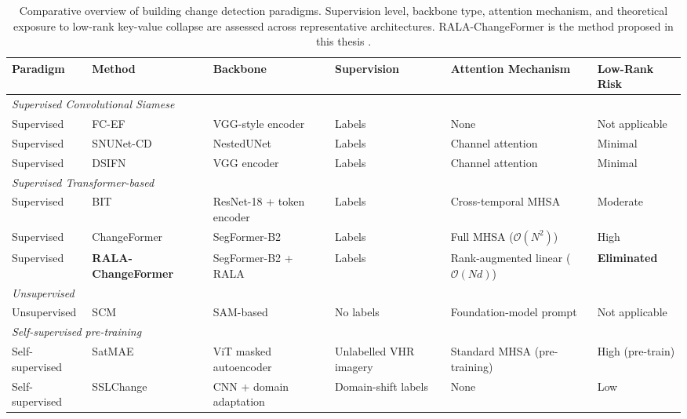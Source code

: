 \begin{table}[htbp]
\centering
{\footnotesize
\caption{Comparative overview of building change detection paradigms. Supervision level, backbone type, attention mechanism, and theoretical exposure to low-rank key-value collapse are assessed across representative architectures. RALA-ChangeFormer is the method proposed in this thesis \cite{acuna2026efficient}.}
\label{tab:bcd_paradigms}
\begin{tabularx}{\textwidth}{p{1.6cm} >{\hsize=1.45\hsize\raggedright\arraybackslash}X >{\hsize=0.9\hsize\raggedright\arraybackslash}X p{1.4cm} >{\hsize=0.65\hsize\raggedright\arraybackslash}X p{1.5cm}}
\hline
\textbf{Paradigm} & \textbf{Method} & \textbf{Backbone} & \textbf{Supervision} & \textbf{Attention Mechanism} & \textbf{Low-Rank Risk} \\
\hline
\multicolumn{6}{l}{\textit{Supervised Convolutional Siamese}} \\[2pt]
Supervised & FC-EF \cite{Daudt2018SiamICIP} & VGG-style encoder & Labels & None & Not applicable \\
Supervised & SNUNet-CD \cite{Fang2021SNUNetCD} & NestedUNet & Labels & Channel attention & Minimal \\
Supervised & DSIFN \cite{Zhang2020FusionNetDSIFN} & VGG encoder & Labels & Channel attention & Minimal \\
\hline
\multicolumn{6}{l}{\textit{Supervised Transformer-based}} \\[2pt]
Supervised & BIT \cite{Chen2022BIT} & ResNet-18 + token encoder & Labels & Cross-temporal MHSA & Moderate \\
Supervised & ChangeFormer \cite{Bandara2022ChangeFormer} & SegFormer-B2 & Labels & Full MHSA ($\mathcal{O}(N^2)$) & High \\
\rowcolor{pastelorange}
Supervised & \textbf{RALA-ChangeFormer} \cite{acuna2026efficient} & SegFormer-B2 + RALA & Labels & Rank-augmented linear ($\mathcal{O}(Nd)$) & \textbf{Eliminated} \\
\hline
\multicolumn{6}{l}{\textit{Unsupervised}} \\[2pt]
Unsupervised & SCM \cite{Zhao2023SCM} & SAM-based & No labels & Foundation-model prompt & Not applicable \\
\hline
\multicolumn{6}{l}{\textit{Self-supervised pre-training}} \\[2pt]
Self-supervised & SatMAE \cite{Cong2022SatMAE} & ViT masked autoencoder & Unlabelled VHR imagery & Standard MHSA (pre-training) & High (pre-train) \\
Self-supervised & SSLChange \cite{Zhao2024SSLChange} & CNN + domain adaptation & Domain-shift labels & None & Low \\
\hline
\end{tabularx}
}%
\end{table}